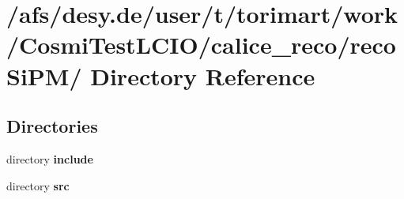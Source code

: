 \section{/afs/desy.de/user/t/torimart/work/CosmiTestLCIO/calice\_\-reco/recoSiPM/ Directory Reference}
\label{dir_01780ac29724157a4922dcd586d6082b}
\subsection*{Directories}
\begin{DoxyCompactItemize}
\item 
directory {\bf include}
\item 
directory {\bf src}
\end{DoxyCompactItemize}
